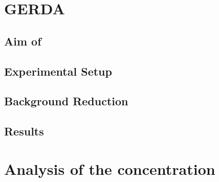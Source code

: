 
\section{GERDA}
\label{sec:GERDA}


\subsection{Aim of \GERDA}
\label{sec:AimGERDA}


\subsection{Experimental Setup}
\label{sec:ExSetup}


\subsection{Background Reduction}
\label{sec:BGReduction}


\subsection{Results}
\label{sec:ResultsofGERDA}


\section{Analysis of the  concentration}
\label{sec:AotKr}

